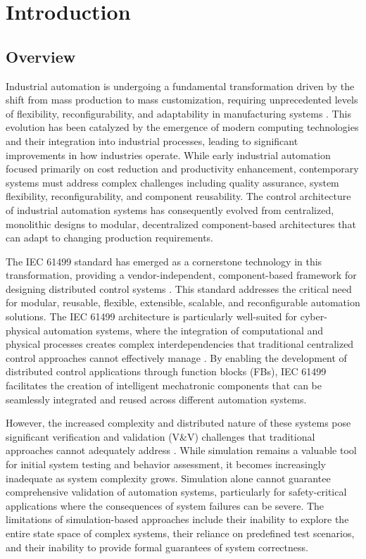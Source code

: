 
\section{Introduction}
\subsection{Overview}

Industrial automation is undergoing a fundamental transformation driven by the shift from mass production to mass customization, requiring unprecedented levels of flexibility, reconfigurability, and adaptability in manufacturing systems \cite{lee2017introduction}. This evolution has been catalyzed by the emergence of modern computing technologies and their integration into industrial processes, leading to significant improvements in how industries operate. While early industrial automation focused primarily on cost reduction and productivity enhancement, contemporary systems must address complex challenges including quality assurance, system flexibility, reconfigurability, and component reusability. The control architecture of industrial automation systems has consequently evolved from centralized, monolithic designs to modular, decentralized component-based architectures that can adapt to changing production requirements.

The IEC 61499 standard \cite{iec61499} has emerged as a cornerstone technology in this transformation, providing a vendor-independent, component-based framework for designing distributed control systems \cite{vyatkin2011iec}. This standard addresses the critical need for modular, reusable, flexible, extensible, scalable, and reconfigurable automation solutions. The IEC 61499 architecture is particularly well-suited for cyber-physical automation systems, where the integration of computational and physical processes creates complex interdependencies that traditional centralized control approaches cannot effectively manage \cite{hanisch2009one}. By enabling the development of distributed control applications through function blocks (FBs), IEC 61499 facilitates the creation of intelligent mechatronic components that can be seamlessly integrated and reused across different automation systems.

However, the increased complexity and distributed nature of these systems pose significant verification and validation (V\&V) challenges that traditional approaches cannot adequately address \cite{sinha2019survey}. While simulation remains a valuable tool for initial system testing and behavior assessment, it becomes increasingly inadequate as system complexity grows. Simulation alone cannot guarantee comprehensive validation of automation systems, particularly for safety-critical applications where the consequences of system failures can be severe. The limitations of simulation-based approaches include their inability to explore the entire state space of complex systems, their reliance on predefined test scenarios, and their inability to provide formal guarantees of system correctness.

